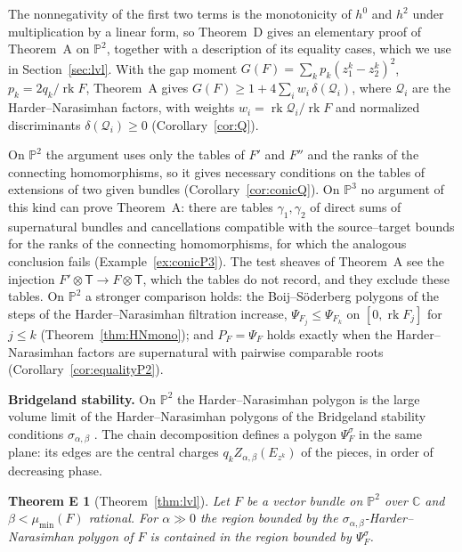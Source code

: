 \documentclass[11pt]{amsart}
\newtheorem*{theoremE}{Theorem E}
\theoremstyle{definition}
\theoremstyle{remark}
\newcommand{\PP}{\mathbb{P}}
\newcommand{\cQ}{\mathcal{Q}}
\newcommand{\Tt}{\mathsf{T}}
\DeclareMathOperator{\rk}{rk}
\begin{document}
The nonnegativity of the first two terms is the monotonicity of $h^0$ and $h^2$ under multiplication by a linear form, so Theorem~D gives an elementary proof of Theorem~A on $\PP^2$, together with a description of its equality cases, which we use in Section~\ref{sec:lvl}. With the gap moment $G(F)=\sum_kp_k(z^k_1-z^k_2)^2$, $p_k=2q_k/\rk F$, Theorem~A gives $G(F)\ge1+4\sum_iw_i\,\delta(\cQ_i)$, where $\cQ_i$ are the Harder--Narasimhan factors, with weights $w_i=\rk\cQ_i/\rk F$ and normalized discriminants $\delta(\cQ_i)\ge0$ (Corollary~\ref{cor:Q}).

On $\PP^2$ the argument uses only the tables of $F'$ and $F''$ and the ranks of the connecting homomorphisms, so it gives necessary conditions on the tables of extensions of two given bundles (Corollary~\ref{cor:conicQ}). On $\PP^3$ no argument of this kind can prove Theorem~A: there are tables $\gamma_1,\gamma_2$ of direct sums of supernatural bundles and cancellations compatible with the source--target bounds for the ranks of the connecting homomorphisms, for which the analogous conclusion fails (Example~\ref{ex:conicP3}). The test sheaves of Theorem~A see the injection $F'\otimes \Tt\to F\otimes \Tt$, which the tables do not record, and they exclude these tables. On $\PP^2$ a stronger comparison holds: the Boij--Söderberg polygons of the steps of the Harder--Narasimhan filtration increase, $\Psi_{F_j}\le\Psi_{F_k}$ on $[0,\rk F_j]$ for $j\le k$ (Theorem~\ref{thm:HNmono}); and $P_F=\Psi_F$ holds exactly when the Harder--Narasimhan factors are supernatural with pairwise comparable roots (Corollary~\ref{cor:equalityP2}).

\medskip\noindent\textbf{Bridgeland stability.}
On $\PP^2$ the Harder--Narasimhan polygon is the large volume limit of the Harder--Narasimhan polygons of the Bridgeland stability conditions $\sigma_{\alpha,\beta}$ \cite{Br08,ABCH13}. The chain decomposition defines a polygon $\Psi^\sigma_F$ in the same plane: its edges are the central charges $q_kZ_{\alpha,\beta}(E_{z^k})$ of the pieces, in order of decreasing phase.

\begin{theoremE}[Theorem~\ref{thm:lvl}]
Let $F$ be a vector bundle on $\PP^2$ over $\mathbb C$ and $\beta<\mu_{\min}(F)$ rational. For $\alpha\gg0$ the region bounded by the $\sigma_{\alpha,\beta}$-Harder--Narasimhan polygon of $F$ is contained in the region bounded by $\Psi^\sigma_F$.
\end{theoremE}
\end{document}
